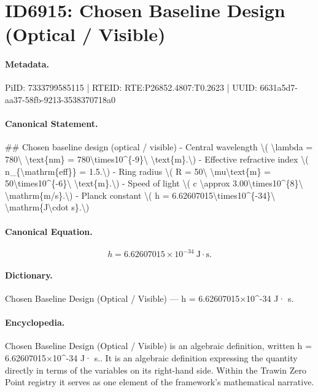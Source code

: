 \section*{ID6915: Chosen Baseline Design (Optical / Visible)}
\paragraph{Metadata.}
PiID: 7333799585115 | RTEID: RTE:P26852.4807:T0.2623 | UUID: 6631a5d7-aa37-58fb-9213-3538370718a0

\paragraph{Canonical Statement.}
\#\# Chosen baseline design (optical / visible) - Central wavelength \textbackslash{}( \textbackslash{}lambda = 780\textbackslash{} \textbackslash{}text\{nm\} = 780\textbackslash{}times10\textasciicircum{}\{-9\}\textbackslash{} \textbackslash{}text\{m\}.\textbackslash{}) - Effective refractive index \textbackslash{}( n\_\{\textbackslash{}mathrm\{eff\}\} = 1.5.\textbackslash{}) - Ring radius \textbackslash{}( R = 50\textbackslash{} \textbackslash{}mu\textbackslash{}text\{m\} = 50\textbackslash{}times10\textasciicircum{}\{-6\}\textbackslash{} \textbackslash{}text\{m\}.\textbackslash{}) - Speed of light \textbackslash{}( c \textbackslash{}approx 3.00\textbackslash{}times10\textasciicircum{}\{8\}\textbackslash{} \textbackslash{}mathrm\{m/s\}.\textbackslash{}) - Planck constant \textbackslash{}( h = 6.62607015\textbackslash{}times10\textasciicircum{}\{-34\}\textbackslash{} \textbackslash{}mathrm\{J\textbackslash{}cdot s\}.\textbackslash{})

\paragraph{Canonical Equation.}
\[
h = 6.62607015\times10^{-34}\ \mathrm{J\cdot s}.
\]

\paragraph{Dictionary.}
Chosen Baseline Design (Optical / Visible) — h = 6.62607015×10\textasciicircum{}-34 J· s.

\paragraph{Encyclopedia.}
Chosen Baseline Design (Optical / Visible) is an algebraic definition, written h = 6.62607015×10\textasciicircum{}-34 J· s.. It is an algebraic definition expressing the quantity directly in terms of the variables on its right-hand side. Within the Trawin Zero Point registry it serves as one element of the framework's mathematical narrative.
